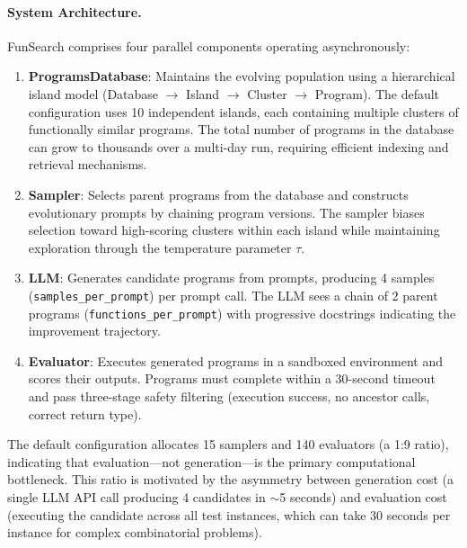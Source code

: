 \paragraph{System Architecture.}
FunSearch comprises four parallel components operating asynchronously:
\begin{enumerate}
    \item \textbf{ProgramsDatabase}: Maintains the evolving population using a hierarchical island model (Database $\rightarrow$ Island $\rightarrow$ Cluster $\rightarrow$ Program). The default configuration uses 10 independent islands, each containing multiple clusters of functionally similar programs. The total number of programs in the database can grow to thousands over a multi-day run, requiring efficient indexing and retrieval mechanisms.
    \item \textbf{Sampler}: Selects parent programs from the database and constructs evolutionary prompts by chaining program versions. The sampler biases selection toward high-scoring clusters within each island while maintaining exploration through the temperature parameter $\tau$.
    \item \textbf{LLM}: Generates candidate programs from prompts, producing 4 samples (\texttt{samples\_per\_prompt}) per prompt call. The LLM sees a chain of 2 parent programs (\texttt{functions\_per\_prompt}) with progressive docstrings indicating the improvement trajectory.
    \item \textbf{Evaluator}: Executes generated programs in a sandboxed environment and scores their outputs. Programs must complete within a 30-second timeout and pass three-stage safety filtering (execution success, no ancestor calls, correct return type).
\end{enumerate}
The default configuration allocates 15 samplers and 140 evaluators (a 1:9 ratio), indicating that evaluation---not generation---is the primary computational bottleneck. This ratio is motivated by the asymmetry between generation cost (a single LLM API call producing 4 candidates in $\sim$5 seconds) and evaluation cost (executing the candidate across all test instances, which can take 30 seconds per instance for complex combinatorial problems).

